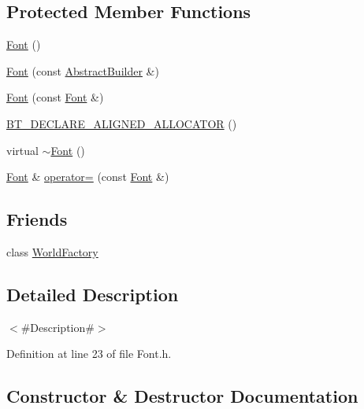 \subsection*{Protected Member Functions}
\begin{DoxyCompactItemize}
\item 
\mbox{\hyperlink{classnjli_1_1_font_a68907f421c0aa100e9d91deb7b4ad702}{Font}} ()
\item 
\mbox{\hyperlink{classnjli_1_1_font_af2ea00a4ebba3ab57a719c811677e96d}{Font}} (const \mbox{\hyperlink{classnjli_1_1_abstract_builder}{Abstract\+Builder}} \&)
\item 
\mbox{\hyperlink{classnjli_1_1_font_a70fbc2653acb46488f802a21c53986a0}{Font}} (const \mbox{\hyperlink{classnjli_1_1_font}{Font}} \&)
\item 
\mbox{\hyperlink{classnjli_1_1_font_ad364f7591804a6e096d3ce271c68a93f}{B\+T\+\_\+\+D\+E\+C\+L\+A\+R\+E\+\_\+\+A\+L\+I\+G\+N\+E\+D\+\_\+\+A\+L\+L\+O\+C\+A\+T\+OR}} ()
\item 
virtual \mbox{\hyperlink{classnjli_1_1_font_a64397a81eafa58c09fae5e2937649dff}{$\sim$\+Font}} ()
\item 
\mbox{\hyperlink{classnjli_1_1_font}{Font}} \& \mbox{\hyperlink{classnjli_1_1_font_a8b68124c0366fa0e9654761ce94865e8}{operator=}} (const \mbox{\hyperlink{classnjli_1_1_font}{Font}} \&)
\end{DoxyCompactItemize}
\subsection*{Friends}
\begin{DoxyCompactItemize}
\item 
class \mbox{\hyperlink{classnjli_1_1_font_acb96ebb09abe8f2a37a915a842babfac}{World\+Factory}}
\end{DoxyCompactItemize}


\subsection{Detailed Description}
$<$\#\+Description\#$>$ 

Definition at line 23 of file Font.\+h.



\subsection{Constructor \& Destructor Documentation}
\mbox{\label{classnjli_1_1_font_a68907f421c0aa100e9d91deb7b4ad702}} 
